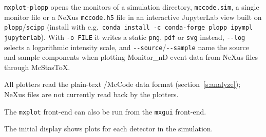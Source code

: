 \verb+mxplot-plopp+ opens the monitors of a simulation directory, \texttt{mccode.sim}, a single
monitor file or a NeXus \texttt{mccode.h5} file in an interactive JupyterLab view built on
\texttt{plopp}/\texttt{scipp} (install with e.g.\ \texttt{conda install -c conda-forge plopp
ipympl jupyterlab}). With \verb+-o FILE+ it writes a static \texttt{png}, \texttt{pdf} or
\texttt{svg} instead, \verb+--log+ selects a logarithmic intensity scale, and
\verb+--source+/\verb+--sample+ name the source and sample components when plotting
Monitor\_nD event data from NeXus files through McStasToX.

All plotters read the plain-text \MCX/McCode data format (section~\ref{s:analyze});
NeXus files are not currently read back by the plotters.

The \verb+mxplot+ front-end can also be run from the \verb+mxgui+ front-end.

The initial display shows plots for each detector in the simulation.

